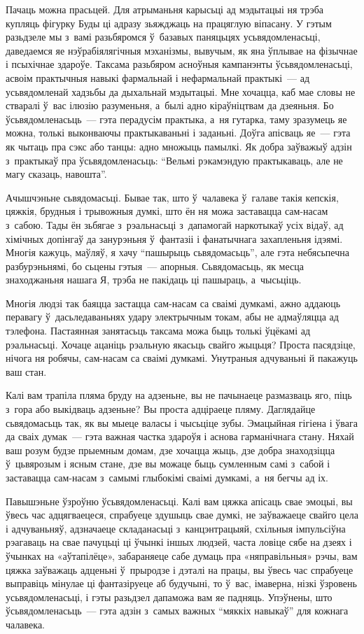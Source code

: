 Пачаць можна прасьцей. Для атрыманьня карысьці ад мэдытацыі ня трэба купляць фігурку Буды ці адразу зьяжджаць на працяглую віпасану. У гэтым разьдзеле мы з~вамі разьбяромся ў~базавых паняцьцях усьвядомленасьці, даведаемся яе нэўрабіялягічныя мэханізмы, вывучым, як яна ўплывае на фізычнае і псыхічнае здароўе. Таксама разьбяром асноўныя кампанэнты ўсьвядомленасьці, асвоім практычныя навыкі фармальнай і нефармальнай практыкі~--- ад усьвядомленай хадзьбы да дыхальнай мэдытацыі. Мне хочацца, каб мае словы не стваралі ў~вас ілюзію разуменьня, а~былі адно кіраўніцтвам да дзеяньня. Бо ўсьвядомленасьць~--- гэта перадусім практыка, а~ня гутарка, таму зразумець яе можна, толькі выконваючы практыкаваньні і заданьні. Доўга апісваць яе~--- гэта як чытаць пра сэкс або танцы: адно множыць памылкі. Як добра заўважыў адзін з~практыкаў пра ўсьвядомленасьць: ``Вельмі рэкамэндую практыкаваць, але не магу сказаць, навошта''.

Ачышчэньне сьвядомасьці. Бывае так, што ў~чалавека ў~галаве такія кепскія, цяжкія, брудныя і трывожныя думкі, што ён ня можа заставацца сам-насам з~сабою. Тады ён зьбягае з~рэальнасьці з~дапамогай наркотыкаў усіх відаў, ад хімічных допінгаў да занурэньня ў~фантазіі і фанатычнага захапленьня ідэямі. Многія кажуць, маўляў, я хачу ``пашырыць сьвядомасьць'', але гэта небясьпечна разбурэньнямі, бо сьцены гэтыя~--- апорныя. Сьвядомасьць, як месца знаходжаньня нашага Я, трэба не пакідаць ці пашыраць, а~чысьціць.

Многія людзі так баяцца застацца сам-насам са сваімі думкамі, ажно аддаюць перавагу ў~дасьледаваньнях удару электрычным токам, абы не адмаўляцца ад тэлефона. Пастаянная занятасьць таксама можа быць толькі ўцёкамі ад рэальнасьці. Хочаце ацаніць рэальную якасьць свайго жыцьця? Проста пасядзіце, нічога ня робячы, сам-насам са сваімі думкамі. Унутраныя адчуваньні й пакажуць ваш стан.

Калі вам трапіла пляма бруду на адзеньне, вы не пачынаеце размазваць яго, піць з~гора або выкідваць адзеньне? Вы проста адціраеце пляму. Даглядайце сьвядомасьць так, як вы мыеце валасы і чысьціце зубы. Эмацыйная гігіена і ўвага да сваіх думак~--- гэта важная частка здароўя і аснова гарманічнага стану. Няхай ваш розум будзе прыемным домам, дзе хочацца жыць, дзе добра знаходзіцца ў~цьвярозым і ясным стане, дзе вы можаце быць сумленным самі з~сабой і заставацца сам-насам з~самымі глыбокімі сваімі думкамі, а~ня бегчы ад іх.

Павышэньне ўзроўню ўсьвядомленасьці. Калі вам цяжка апісаць свае эмоцыі, вы ўвесь час адцягваецеся, спрабуеце здушыць свае думкі, не заўважаеце свайго цела і адчуваньняў, адзначаеце складанасьці з~канцэнтрацыяй, схільныя імпульсіўна рэагаваць на свае пачуцьці ці ўчынкі іншых людзей, часта ловіце сябе на дзеях і ўчынках на «аўтапілёце», забараняеце сабе думаць пра «няправільныя» рэчы, вам цяжка заўважаць адценьні ў~прыродзе і дэталі на працы, вы ўвесь час спрабуеце выправіць мінулае ці фантазіруеце аб будучыні, то ў~вас, імаверна, нізкі ўзровень усьвядомленасьці, і гэты разьдзел дапаможа вам яе падняць. Упэўнены, што ўсьвядомленасьць~--- гэта адзін з~самых важных ``мяккіх навыкаў'' для кожнага чалавека.

